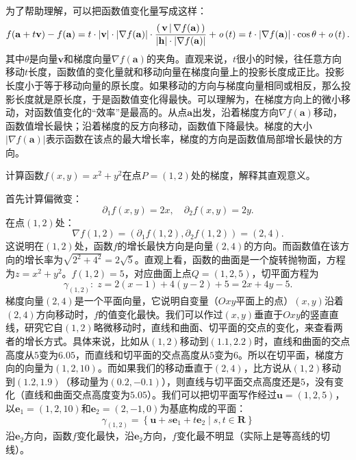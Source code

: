 \documentclass[12pt,UTF8]{ctexbook}
\begin{document}
为了帮助理解，可以把函数值变化量写成这样：
$$ f(\mathbf{a} + t \mathbf{v}) - f(\mathbf{a}) = t \cdot |\mathbf{v}| \cdot |\nabla f(\mathbf{a})| \cdot \frac{\displaystyle\left( \,\mathbf{v} \,\middle\vert \,\nabla f(\mathbf{a}) \,\right)}{|\mathbf{h}|\cdot|\nabla f(\mathbf{a})|}  + \mathit{o}\left(t\right) =  t \cdot |\nabla f(\mathbf{a})| \cdot \cos{\theta}  + \mathit{o}\left(t\right).$$
其中$\theta$是向量$\mathbf{v}$和梯度向量$\nabla f(\mathbf{a})$的夹角。直观来说，$t$很小的时候，往任意方向移动$t$长度，函数值的变化量就和移动向量在梯度向量上的投影长度成正比。投影长度小于等于移动向量的原长度。如果移动的方向与梯度向量相同或相反，那么投影长度就是原长度，于是函数值变化得最快。可以理解为，在梯度方向上的微小移动，对函数值变化的“效率”是最高的。从点$\mathbf{a}$出发，沿着梯度方向$\nabla f(\mathbf{a})$移动，函数值增长最快；沿着梯度的反方向移动，函数值下降最快。梯度的大小$|\nabla f(\mathbf{a})|$表示函数在该点的最大增长率，梯度的方向是函数值局部增长最快的方向。

\begin{et}
计算函数$f(x,y) = x^2 + y^2$在点$P=(1,2)$处的梯度，解释其直观意义。
\end{et}
\begin{so}
首先计算偏微变：
$$ \partial_1 f(x,y) = 2x, \quad \partial_2 f(x,y) = 2y. $$
在点$(1,2)$处：
$$ \nabla f(1,2) = (\partial_1 f(1,2), \partial_2 f(1,2)) = (2, 4). $$
这说明在$(1,2)$处，函数$f$的增长最快方向是向量$(2,4)$的方向。而函数值在该方向的增长率为$\sqrt{2^2 + 4^2} = 2\sqrt{5}$。直观上看，函数的曲面是一个旋转抛物面，方程为$z = x^2 + y^2$。$f(1,2) = 5$，对应曲面上点$Q=(1,2,5)$，切平面方程为
$$\gamma_{(1,2)}: \;z = 2(x - 1) + 4(y - 2) + 5 = 2x + 4y - 5. $$
梯度向量$(2,4)$是一个平面向量，它说明自变量（$Oxy$平面上的点）$(x,y)$沿着$(2,4)$方向移动时，$f$的值变化最快。我们可以作过$(x,y)$垂直于$Oxy$的竖直直线，研究它自$(1,2)$略微移动时，直线和曲面、切平面的交点的变化，来查看两者的增长方式。具体来说，比如从$(1,2)$移动到$(1.1,2.2)$时，直线和曲面的交点高度从$5$变为$6.05$，而直线和切平面的交点高度从$5$变为$6$。所以在切平面，梯度方向的向量为$(1,2,10)$。而如果我们的移动垂直于$(2,4)$，比方说从$(1,2)$移动到$(1.2, 1.9)$（移动量为$(0.2, -0.1)$），则直线与切平面交点高度还是$5$，没有变化（直线和曲面交点高度变为$5.05$）。我们可以把切平面写作经过$\mathbf{u}=(1,2,5)$，以$\mathbf{e}_1 = (1,2,10)$和$\mathbf{e}_2 = (2,-1,0)$为基底构成的平面：
$$ \gamma_{(1,2)} = \left\{ \mathbf{u} + s\mathbf{e}_1 + t\mathbf{e}_2 \; | \; s, t \in \mathbf{R}\right\} $$
沿$\mathbf{e}_2$方向，函数$f$变化最快，沿$\mathbf{e}_2$方向，$f$变化最不明显（实际上是等高线的切线）。
\end{so}
\end{document}
